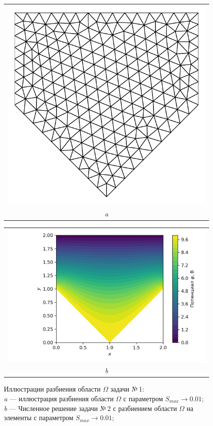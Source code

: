 \documentclass[12pt, a4paper]{article}
\begin{document}
			\begin{figure}[h]       
				\vspace{5.0mm} 
				\centering
					{ 
						\begin{tabular}{@{}c@{}}
							\includegraphics[width=0.35\linewidth]{Test_domain_4_mesh001_calfem_net.pdf} \\[\abovecaptionskip]
							\textit{a} 
						\end{tabular}                          
					} 
					\vspace{\floatsep}
					{ 
						\begin{tabular}{@{}c@{}}
							\includegraphics[width=0.55\linewidth]{Test_domain_4_mesh001_calfem.png}\\[\abovecaptionskip]
							\textit{b} 
						\end{tabular}                                 
					}
									
				\caption{Иллюстрации разбиения области $\Omega$ задачи №\,1:\\
					\textit{a} --- иллюстрация разбиения области $\Omega$ с параметром $S_{max} \rightarrow 0.01$; \\
					\textit{b} --- Численное решение задачи №\,2 с разбиением области $\Omega$ на  элементы с параметром $S_{max} \rightarrow 0.01$; \\
				} 
			\end{figure}
			
\end{document}
